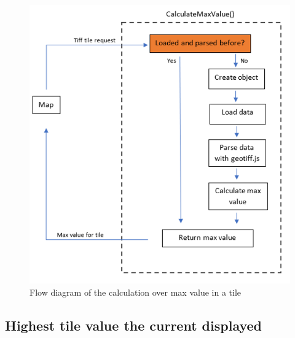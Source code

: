 \begin{figure} [H]
	\centering
	\includegraphics[width=.8\textwidth]{Pictures/CalculateMaxValue}
	\caption{Flow diagram of the calculation over max value in a tile}
	\label{CalculateMaxValue}
\end{figure}



\subsection{Highest tile value the current displayed}



